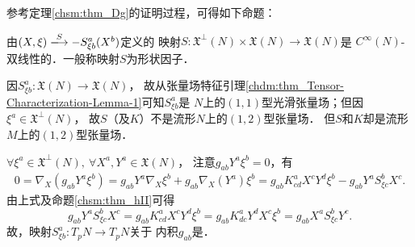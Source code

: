 参考定理\ref{chsm:thm_Dg}的证明过程，可得如下命题：
\begin{proposition}\label{chsm:thm_Swein}
    由$(X,\xi)\xlongrightarrow{S}- S^a_{\xi b}(X^b)$定义的
    映射$S:\mathfrak{X}^\bot(N)\times \mathfrak{X}(N) \to \mathfrak{X}(N)$是
    $C^\infty(N)$-双线性的．一般称映射$S$为{\heiti 形状因子}．
\end{proposition}
因$S^a_{\xi b} : \mathfrak{X}(N) \to \mathfrak{X}(N)$，
故从张量场特征引理\ref{chdm:thm_Tensor-Characterization-Lemma-1}可知$S^a_{\xi b}$是
$N$上的$(1,1)$型光滑张量场；但因$\xi^a \in \mathfrak{X}^\bot (N)$，
故$S$（及$K$）不是流形$N$上的$(1,2)$型张量场．
但$S$和$K$却是流形${M}$上的$(1,2)$型张量场．

$\forall \xi^a \in \mathfrak{X}^\bot(N),
\ \forall X^a, Y^a \in \mathfrak{X}(N)$，
注意${g}_{ab} Y^a \xi^b=0$，有
\begin{align*}
    0={\nabla}_{X} ({g}_{ab} Y^a \xi^b)=
    {g}_{ab} Y^a {\nabla}_{X} \xi^b+
    {g}_{ab} {\nabla}_{X} ( Y^a ) \xi^b
    ={g}_{ab} K^a_{cd} X^c Y^d \xi^b
    -{g}_{ab} Y^a S^b_{\xi c} X^c .
\end{align*}
由上式及命题{\ref{chsm:thm_hII}}可得
\begin{equation}\label{chsm:eqn_sym-Sh}
    {g}_{ab} Y^a  S^b_{\xi c} X^c=
    {g}_{ab} K^a_{cd} X^c Y^d \xi^b
    ={g}_{ab} K^a_{dc}  Y^d X^c \xi^b
    ={g}_{ab} X^a S^b_{\xi c} Y^c .
\end{equation}
故，映射$S^a_{\xi b}:T_pN \to T_pN$关于
内积${g}_{ab}$是．


